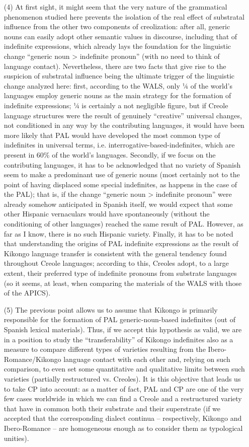 \documentclass[output=paper,colorlinks,citecolor=brown]{langscibook}
\begin{document}
\begin{enumerate}
    \item[(4)] At first sight, it might seem that the very nature of the grammatical phenomenon studied here prevents the isolation of the real effect of substratal influence from the other two components of creolization: after all, generic nouns can easily adopt other semantic values in discourse, including that of indefinite expressions, which already lays the foundation for the linguistic change “generic noun > indefinite pronoun” (with no need to think of language contact). Nevertheless, there are two facts that give rise to the suspicion of substratal influence being the ultimate trigger of the linguistic change analyzed here: first, according to the WALS, only ¼ of the world’s languages employ generic nouns as the main strategy for the formation of indefinite expressions; ¼ is certainly a not negligible figure, but if Creole language structures were the result of genuinely “creative” universal changes, not conditioned in any way by the contributing languages, it would have been more likely that PAL would have developed the most common type of indefinites in universal terms, i.e. interrogative-based-indefinites, which are present in 60\% of the world’s languages. Secondly, if we focus on the contributing languages, it has to be acknowledged that no variety of Spanish seem to make a predominant use of generic nouns (most certainly not to the point of having displaced some special indefinites, as  happens in the case of the PAL); that is, if the change “generic noun > indefinite pronoun” were already somehow anticipated in Spanish itself, we would expect that some other Hispanic vernaculars would have spontaneously (without the conditioning of other languages) reached the same result of PAL. However, as far as I know, there is no such Hispanic variety. Finally, it has to be noted that understanding the origins of PAL indefinite expressions as the result of Kikongo language transfer is consistent with the general tendency found throughout Creole languages; according to this, Creoles adopt, to a large extent, their preferred type of indefinite pronouns from substrate languages (so it seems, at least, when comparing the materials of the WALS with those of the APICS).
    \item[(5)] The previous point allows us to assume that Kikongo is primarily responsible for the formation of PAL generic\hyp noun\hyp based indefinites (out of Spanish lexical materials). Thus, if we accept this hypothesis as valid, we are in a position to study the “transferability” of Kikongo indefinites also as a measure to compare different types of varieties resulting from the Ibero\hyp Romance\slash Kikongo language contact with each other and, relying on such comparison, to even set some quantitative and qualitative limits between such varieties (partially restructured vs. Creoles). It is this objective that leads us to take CP into account: as a matter of fact, PAL and CP are one of the very few cases worldwide in which we can find a Creole and a restructured variety that have in common both their substrate and their superstrate (if we accepted that the corresponding dialect continua – respectively, Kikongo and Ibero\hyp Romance – are homogeneous enough as to consider them as typological unities).

\end{enumerate}
\end{document}
